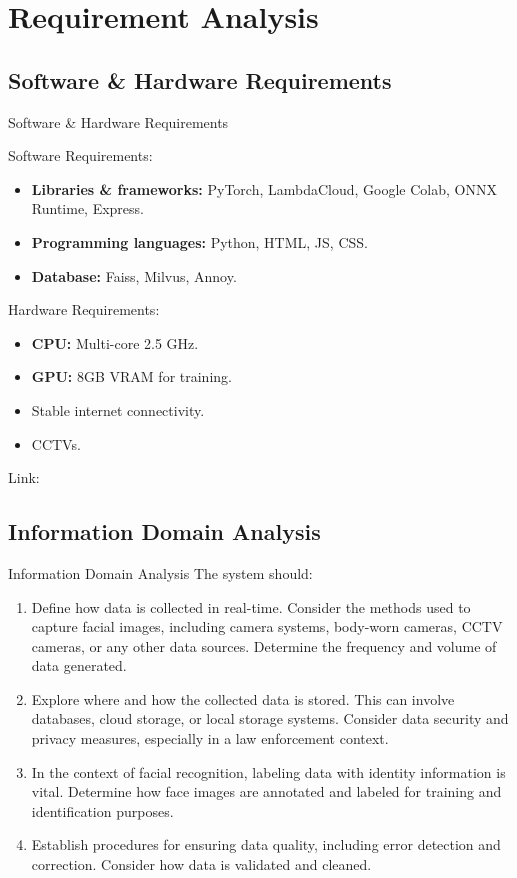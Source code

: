 \section{Requirement Analysis}

\subsection{Software \& Hardware Requirements}
\begin{frame}{Software \& Hardware Requirements}
	\begin{multicols}{2}
		Software Requirements:
		\begin{itemize}
			\item \textbf{Libraries \& frameworks:} PyTorch, LambdaCloud, Google Colab, ONNX Runtime, Express.
			\item \textbf{Programming languages:} Python, HTML, JS, CSS.
			\item \textbf{Database:} Faiss, Milvus, Annoy.
		\end{itemize}

		\break

		Hardware Requirements:
		\begin{itemize}
			\item \textbf{CPU:} Multi-core 2.5 GHz.
			\item \textbf{GPU:} 8GB VRAM for training.
			\item Stable internet connectivity.
			\item CCTVs.
		\end{itemize}
	\end{multicols}
	Link: \textcolor{blue}{\underline{}}
\end{frame}

\subsection{Information Domain Analysis}
\begin{frame}{Information Domain Analysis}
	The system should:
	\begin{enumerate}
		\item Define how data is collected in real-time. Consider the methods used to capture facial images, including camera systems, body-worn cameras, CCTV cameras, or any other data sources. Determine the frequency and volume of data generated.
		\item Explore where and how the collected data is stored. This can involve databases, cloud storage, or local storage systems. Consider data security and privacy measures, especially in a law enforcement context.
		\item In the context of facial recognition, labeling data with identity information is vital. Determine how face images are annotated and labeled for training and identification purposes.
		\item Establish procedures for ensuring data quality, including error detection and correction. Consider how data is validated and cleaned.
	\end{enumerate}
\end{frame}

